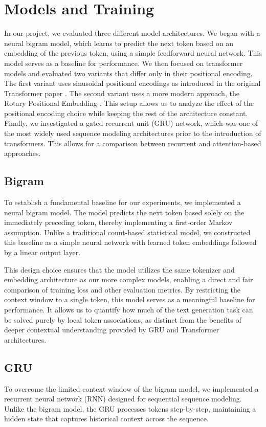 \section{Models and Training} \label{sec:model}
In our project, we evaluated three different model architectures.
We began with a neural bigram model, which learns to predict the next token based on an embedding of the previous token, using a simple feedforward neural network.
This model serves as a baseline for performance.
We then focused on transformer models and evaluated two variants that differ only in their positional encoding.
The first variant uses sinusoidal positional encodings as introduced in the original Transformer paper \cite{attention}.
The second variant uses a more modern approach, the Rotary Positional Embedding \cite{rope}.
This setup allows us to analyze the effect of the positional encoding choice while keeping the rest of the architecture constant.
Finally, we investigated a gated recurrent unit (GRU) network, which was one of the most widely used sequence modeling architectures prior to the introduction of transformers.
This allows for a comparison between recurrent and attention-based approaches.


\subsection{Bigram} \label{subsec:bigram}
To establish a fundamental baseline for our experiments, we implemented a neural bigram model.
The model predicts the next token based solely on the immediately preceding token, thereby implementing a first-order Markov assumption.
Unlike a traditional count-based statistical model, we constructed this baseline as a simple neural network with learned token embeddings followed by a linear output layer. 

This design choice ensures that the model utilizes the same tokenizer and embedding architecture as our more complex models, enabling a direct and fair comparison of training loss and other evaluation metrics.
By restricting the context window to a single token, this model serves as a meaningful baseline for performance.
It allows us to quantify how much of the text generation task can be solved purely by local token associations, as distinct from the benefits of deeper contextual understanding provided by GRU and Transformer architectures.


\subsection{GRU} \label{subsec:gru}
To overcome the limited context window of the bigram model, we implemented a recurrent neural network (RNN) designed for sequential sequence modeling.
Unlike the bigram model, the GRU processes tokens step-by-step, maintaining a hidden state that captures historical context across the sequence.

